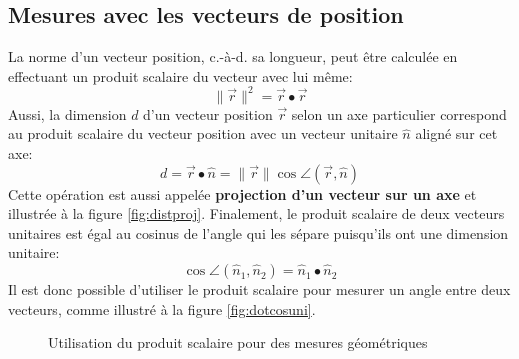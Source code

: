 \subsection{Mesures avec les vecteurs de position}
\label{sec:vecuni}
%
La norme d'un vecteur position, c.-à-d. sa longueur, peut être calculée en effectuant un produit scalaire du vecteur avec lui même:
\begin{equation}
	\| \vec{r} \|^2 = \vec{r} \bullet \vec{r}
	\label{eq:dotnorm}
\end{equation}
Aussi, la dimension $d$ d'un vecteur position $\vec{r}$ selon un axe particulier correspond au produit scalaire du vecteur position avec un vecteur unitaire $\hat{n}$ aligné sur cet axe:
\begin{equation}
	d = \vec{r} \bullet \hat{n} = \| \vec{r} \|  \cos \angle (\vec{r},\hat{n})
	\label{eq:vecproj}
\end{equation}
Cette opération est aussi appelée \textbf{projection d'un vecteur sur un axe} et illustrée à la figure \ref{fig:distproj}. Finalement, le produit scalaire de deux vecteurs unitaires est égal au cosinus de l'angle qui les sépare puisqu'ils ont une dimension unitaire:
\begin{equation}
	\cos \angle (\hat{n}_1,\hat{n}_2) =  \hat{n}_1 \bullet \hat{n}_2
	\label{eq:dotangle}
\end{equation}
Il est donc possible d'utiliser le produit scalaire pour mesurer un angle entre deux vecteurs, comme illustré à la figure \ref{fig:dotcosuni}.
%
\begin{figure}[htbp]
	\centering
	\hspace{20pt}
	\caption{Utilisation du produit scalaire pour des mesures géométriques}
	\label{fig:utprosca}
\end{figure}

